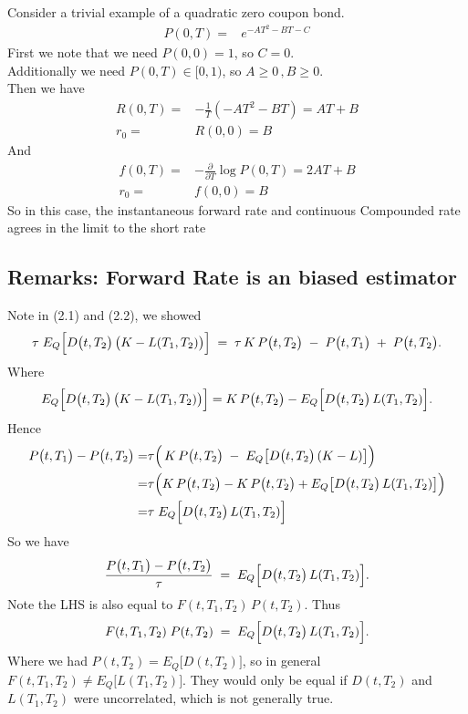 Consider a trivial example of a quadratic zero coupon bond.
\begin{align*}
    P(0, T) =& e^{-A T^2 -B T - C} 
\end{align*}
First we note that we need $P(0, 0) = 1$, so $C = 0$.\\
Additionally we need $P(0, T) \in [0, 1)$, so $A \geq 0 \, , B \geq 0$.\\
Then we have
\begin{align*}
    R(0, T) =& -\frac{1}{T} (-A T^2 -B T) = A T + B \\
    r_0 =& R(0, 0) = B
\end{align*}
And
\begin{align*}
    f(0, T) =& -\frac{\partial}{\partial T} \log P(0, T) = 2 A T + B \\
    r_0 =& f(0, 0) = B
\end{align*}
So in this case, the instantaneous forward rate and continuous Compounded rate
agrees in the limit to the short rate

\subsection{Remarks: Forward Rate is an biased estimator}

Note in (2.1) and (2.2), we showed
\[
    \tau \;E_Q\Bigl[D\bigl(t, T_2\bigr)\,\bigl(K - L(T_1, T_2)\bigr)\Bigr]
    \;=\; \tau\,K \,P\bigl(t, T_2\bigr) \;-\; P\bigl(t, T_1\bigr) \;+\; P\bigl(t, T_2\bigr).
\]
Where
\[
    E_Q\Bigl[D\bigl(t, T_2\bigr)\,\bigl(K - L(T_1, T_2)\bigr)\Bigr]
    = K \,P\bigl(t, T_2\bigr) - E_Q\Bigl[D\bigl(t, T_2\bigr)\,L(T_1, T_2)\Bigr].
\]
Hence
\begin{align*}
    P\bigl(t, T_1\bigr) - P\bigl(t, T_2\bigr) 
    =& \tau \Bigl(\,K\,P\bigl(t, T_2\bigr) \;-\; E_Q\bigl[D\bigl(t, T_2\bigr)\,(K - L)\bigr]\Bigr)\\
    =& \tau \Bigl(K \,P\bigl(t, T_2\bigr) - K\,P\bigl(t, T_2\bigr) 
    + E_Q\bigl[D\bigl(t, T_2\bigr)\,L(T_1, T_2)\bigr]\Bigr) \\
    =& \tau\;E_Q\Bigl[D\bigl(t, T_2\bigr)\,L(T_1, T_2)\Bigr]
\end{align*}
So we have
\[
    \frac{P\bigl(t, T_1\bigr) - P\bigl(t, T_2\bigr)}{\tau}
    \;=\; E_Q\Bigl[D\bigl(t, T_2\bigr)\,L(T_1, T_2)\Bigr].
\]
Note the LHS is also equal to \(F(t, T_1, T_2)\,P(t, T_2)\). Thus
\[
    F(t, T_1, T_2)\;P(t, T_2)
    \;=\; E_Q\Bigl[D\bigl(t, T_2\bigr)\,L(T_1, T_2)\Bigr].
\]
Where we had \(P(t, T_2) = E_Q\bigl[D(t, T_2)\bigr]\), so in general \(F(t, T_1, T_2)\neq E_Q\bigl[L(T_1, T_2)\bigr]\). 
They would only be equal if \(D(t, T_2)\) and \(L(T_1, T_2)\) were uncorrelated, which is not generally true.

